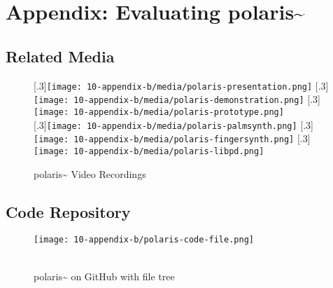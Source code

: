 \chapter{Appendix: Evaluating polaris\textasciitilde{}}

\section{Related Media}
\begin{figure}[!ht]
    \centering
    [.3\linewidth]{\texttt{[image: 10-appendix-b/media/polaris-presentation.png]}}
    \hfill
    [.3\linewidth]{\texttt{[image: 10-appendix-b/media/polaris-demonstration.png]}}
    \hfill
    [.3\linewidth]{\texttt{[image: 10-appendix-b/media/polaris-prototype.png]}} \\
    \vspace*{1cm}
    [.3\linewidth]{\texttt{[image: 10-appendix-b/media/polaris-palmsynth.png]}}
    \hfill
    [.3\linewidth]{\texttt{[image: 10-appendix-b/media/polaris-fingersynth.png]}}
    \hfill
    [.3\linewidth]{\texttt{[image: 10-appendix-b/media/polaris-libpd.png]}}%
    \caption*{polaris\textasciitilde{} Video Recordings}
\end{figure}
\clearpage



\section{Code Repository}
\begin{figure}[!ht]
    \centering
    \texttt{[image: 10-appendix-b/polaris-code-file.png]}
    \caption*{ \\ polaris\textasciitilde{} on GitHub with file tree}
\end{figure}
\clearpage



